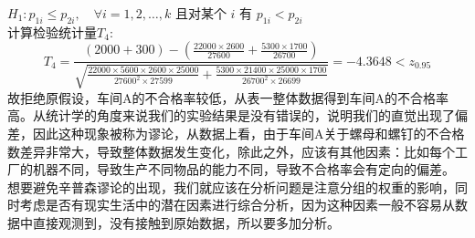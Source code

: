 \documentclass[a4paper, 11pt]{article}
\begin{document}
\indent $H_{1}: p_{1 i} \leq p_{2 i}, \quad \forall i=1,2, \ldots, k \text { 且对某个 } i \text { 有 } p_{1 i}<p_{2 i}$\\
计算检验统计量$ T_{4}: $
$$T_{4}=\frac{(2000+300)-(\frac{22000\times 2600}{27600}+\frac{5300\times 1700}{26700})}{\sqrt{\frac{22000\times 5600\times 2600\times 25000}{27600^{2}\times 27599}+\frac{5300\times 21400 \times 25000\times 1700}{26700^{2}\times 26699}}}=-4.3648<z_{0.95}$$
\indent 故拒绝原假设，车间A的不合格率较低，从表一整体数据得到车间A的不合格率高。从统计学的角度来说我们的实验结果是没有错误的，说明我们的直觉出现了偏差，因此这种现象被称为谬论，从数据上看，由于车间A关于螺母和螺钉的不合格数差异非常大，导致整体数据发生变化，除此之外，应该有其他因素：比如每个工厂的机器不同，导致生产不同物品的能力不同，导致不合格率会有定向的偏差。\\
\indent 想要避免辛普森谬论的出现，我们就应该在分析问题是注意分组的权重的影响，同时考虑是否有现实生活中的潜在因素进行综合分析，因为这种因素一般不容易从数据中直接观测到，没有接触到原始数据，所以要多加分析。
\end{document}
